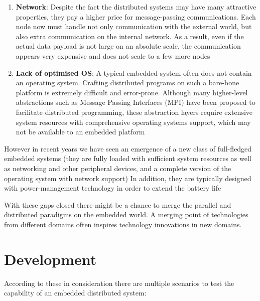 \begin{enumerate}
    \item \textbf{Network}: Despite the fact the distributed systems may have
    many attractive properties, they pay a higher price for message-passing 
    communications. Each node now must handle not only communication with 
    the external world, but also extra communication on the internal network. 
    As a result, even if the actual data payload is not large on an absolute 
    scale, the communication appears very expensive and does not scale to a few
    more nodes

    \item \textbf{Lack of optimised OS}: A typical embedded system often does
    not contain an operating system. Crafting distributed programs on such a
    bare-bone platform is extremely difficult and error-prone. Although many
    higher-level abstractions such as Message Passing Interfaces (MPI) have been
    proposed to facilitate distributed programming, these abstraction layers require
    extensive system resources with comprehensive operating systems support, which
    may not be available to an embedded platform 
    
\end{enumerate}
 
However in recent years we have seen an emergence of a new class of full-fledged
embedded systems (they are fully loaded with sufficient system resources as well
as networking and other peripheral devices, and a complete version of the
operating system with network support) In addition, they are typically designed
with power-management technology in order to extend the battery life

With these gaps closed there might be a chance to merge the parallel and
distributed paradigms on the embedded world.  A merging point of technologies
from different domains often inspires technology innovations in new domains.

\section{Development}

According to these in consideration there are multiple scenarios to test the
capability of an embedded distributed system: 


